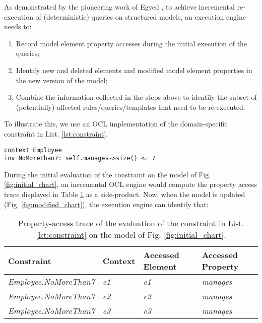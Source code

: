 As demonstrated by the pioneering work of Egyed \cite{egyed2011automatically}, to achieve incremental re-execution of (deterministic) queries on structured models, an execution engine needs to:

\begin{enumerate}
    \item Record model element property accesses during the initial execution of the queries;
    \item Identify new and deleted elements and modified model element properties in the new version of the model;
    \item Combine the information collected in the steps above to identify the subset of (potentially) affected rules/queries/templates that need to be re-executed.
\end{enumerate}

To illustrate this, we use an OCL implementation of the domain-specific constraint in List. \ref{lst:constraint}.

\begin{lstlisting}[style=ocl,caption={OCL constraint requiring that no employee directly manages more than 7 other employees.},label=lst:constraint]
context Employee
inv NoMoreThan7: self.manages->size() <= 7
\end{lstlisting}

During the initial evaluation of the constraint on the model of Fig. \ref{fig:initial_chart}, an incremental OCL engine would compute the property access trace displayed in Table \ref{tab:property_access_trace} as a side-product. Now, when the model is updated (Fig. \ref{fig:modified_chart}), the execution engine can identify that:

\begin{table}[b]
    \centering
    \caption{Property-access trace of the evaluation of the constraint in List. \ref{lst:constraint} on the model of Fig. \ref{fig:initial_chart}.}
    \begin{tabular}{p{4.8cm} p{2.1cm} p{2cm} p{2.1cm}}
        \hline 
        \textbf{Constraint} & \textbf{Context} & \textbf{Accessed Element} & \textbf{Accessed Property} \\ 
        \hline 
        \emph{Employee.NoMoreThan7}  & \emph{e1} & \emph{e1} & \emph{manages} \\ 
        \emph{Employee.NoMoreThan7}  & \emph{e2} & \emph{e2} & \emph{manages} \\ 
        \emph{Employee.NoMoreThan7}  & \emph{e3} & \emph{e3} & \emph{manages} \\ 
        \hline 
    \end{tabular} 
    \label{tab:property_access_trace}
\end{table}

